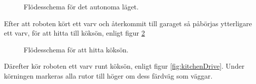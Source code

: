 \documentclass[a4paper,11pt]{article}
\begin{document}
\begin{figure}[h!] \label{fig:auto_flowchart}
	\caption{Flödesschema för det autonoma läget.  \label{fig:wallfollow}}
\end{figure}

Efter att roboten kört ett varv och återkommit till garaget så påbörjas ytterligare ett varv, för att hitta till köksön, enligt figur \ref{fig:kitchenSearch}

\begin{figure}[h!]
 \caption{Flödesschema för att hitta köksön. \label{fig:kitchenSearch}}
 
\end{figure}

Därefter kör roboten ett varv runt köksön, enligt figur \ref{fig:kitchenDrive}. Under körningen markeras alla rutor till höger om dess färdväg som väggar. 
\end{document}
